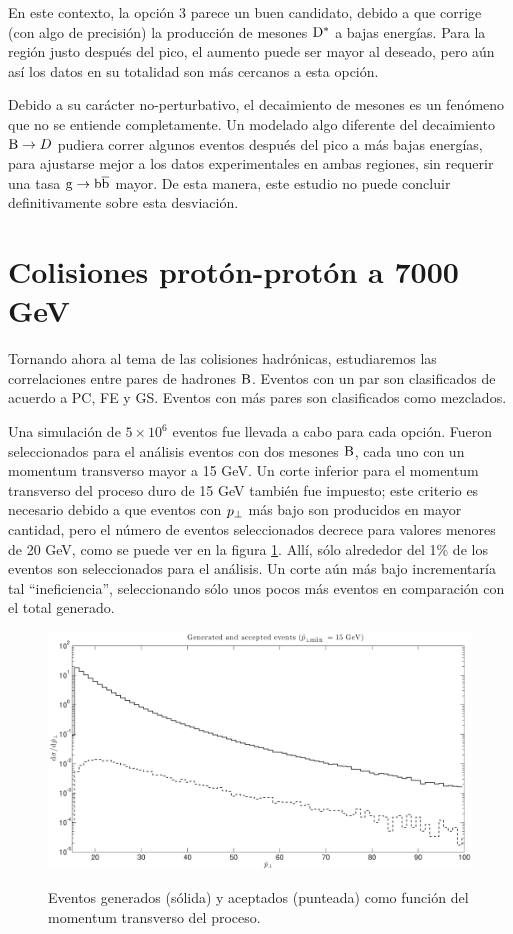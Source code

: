En este contexto, la opción 3 parece un buen candidato, debido a que corrige (con algo de precisión) la producción de mesones ${\mathrm D}^*$ a bajas energías. Para la región justo después del pico, el aumento puede ser mayor al deseado, pero aún así los datos en su totalidad son más cercanos a esta opción.

Debido a su carácter no-perturbativo, el decaimiento de mesones es un fenómeno que no se entiende completamente. Un modelado algo diferente del decaimiento ${\mathrm B}\to D$ pudiera correr algunos eventos después del pico a más bajas energías, para ajustarse mejor a los datos experimentales en ambas regiones, sin requerir una tasa ${\mathrm g}\to{\mathrm b}\overline{\mathrm b}$ mayor. De esta manera, este estudio no puede concluir definitivamente sobre esta desviación.

\section{Colisiones protón-protón a 7000 GeV}

Tornando ahora al tema de las colisiones hadrónicas, estudiaremos las correlaciones entre pares de hadrones ${\mathrm B}$. Eventos con un par son clasificados de acuerdo a PC, FE y GS. Eventos con más pares son clasificados como mezclados.

Una simulación de $5\times10^6$ eventos fue llevada a cabo para cada opción. Fueron seleccionados para el análisis eventos con dos mesones ${\mathrm B}$, cada uno con un momentum transverso mayor a 15 GeV. Un corte inferior para el momentum transverso del proceso duro de 15 GeV también fue impuesto; este criterio es necesario debido a que eventos con $p_{\perp}$ más bajo son producidos en mayor cantidad, pero el número de eventos seleccionados decrece para valores menores de 20 GeV, como se puede ver en la figura \ref{fig:accepted}. Allí, sólo alrededor del 1\% de los eventos son seleccionados para el análisis. Un corte aún más bajo incrementaría tal ``ineficiencia'', seleccionando sólo unos pocos más eventos en comparación con el total generado.

\begin{figure}[h]
\centering
\caption[Eventos generados y aceptados en colisiones hadrónicas.]{Eventos generados (sólida) y aceptados (punteada) como función del momentum transverso del proceso.}
\includegraphics[width=15cm]{Accepted}
\label{fig:accepted}
\end{figure}

